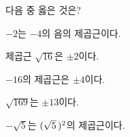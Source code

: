 다음 중 옳은 것은?
\begin{choicesv}{\rule[-3ex]{0pt}{8ex}$-2$는 $-4$의 음의 제곱근이다.}{\rule[-3ex]{0pt}{8ex}제곱근 $\sqrt{16}$은 $\pm 2$이다.}{\rule[-3ex]{0pt}{8ex}$-16$의 제곱근은 $\pm 4$이다.}{\rule[-3ex]{0pt}{8ex}$\sqrt{169}$는 $\pm 13$이다.}{\rule[-3ex]{0pt}{8ex}$-\sqrt{5}$는 $(\sqrt{5}\mkern3mu )^2$의 제곱근이다.}\end{choicesv}
